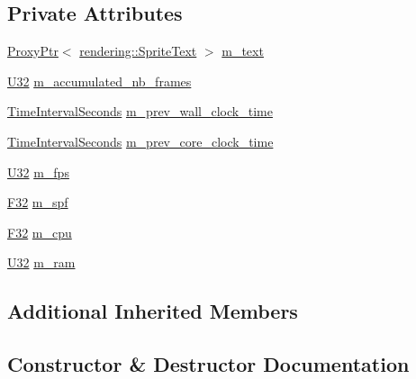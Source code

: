 \subsection*{Private Attributes}
\begin{DoxyCompactItemize}
\item 
\mbox{\hyperlink{classmage_1_1_proxy_ptr}{Proxy\+Ptr}}$<$ \mbox{\hyperlink{classmage_1_1rendering_1_1_sprite_text}{rendering\+::\+Sprite\+Text}} $>$ \mbox{\hyperlink{classmage_1_1script_1_1_stats_script_a1fe11e7a3622fa5e3585fb6786e2d2e7}{m\+\_\+text}}
\item 
\mbox{\hyperlink{namespacemage_aa5d6eaabaac3cdd01873d6a3d27e90f3}{U32}} \mbox{\hyperlink{classmage_1_1script_1_1_stats_script_a7ef910aceb585af53110697ea5b3f810}{m\+\_\+accumulated\+\_\+nb\+\_\+frames}}
\item 
\mbox{\hyperlink{namespacemage_a21c3d1575018d1e0720948713c76be1f}{Time\+Interval\+Seconds}} \mbox{\hyperlink{classmage_1_1script_1_1_stats_script_acb97500f32da69e9069482df1ebdb7b8}{m\+\_\+prev\+\_\+wall\+\_\+clock\+\_\+time}}
\item 
\mbox{\hyperlink{namespacemage_a21c3d1575018d1e0720948713c76be1f}{Time\+Interval\+Seconds}} \mbox{\hyperlink{classmage_1_1script_1_1_stats_script_a8bf822cd1950abc621f8bd751c00ef78}{m\+\_\+prev\+\_\+core\+\_\+clock\+\_\+time}}
\item 
\mbox{\hyperlink{namespacemage_aa5d6eaabaac3cdd01873d6a3d27e90f3}{U32}} \mbox{\hyperlink{classmage_1_1script_1_1_stats_script_adc14b9c342874824422d229c1f8573cc}{m\+\_\+fps}}
\item 
\mbox{\hyperlink{namespacemage_aa97e833b45f06d60a0a9c4fc22ae02c0}{F32}} \mbox{\hyperlink{classmage_1_1script_1_1_stats_script_a999da0fb2033212522a1c45a992dcd37}{m\+\_\+spf}}
\item 
\mbox{\hyperlink{namespacemage_aa97e833b45f06d60a0a9c4fc22ae02c0}{F32}} \mbox{\hyperlink{classmage_1_1script_1_1_stats_script_ad7af4d0fec97fd30637d6c1d393c8623}{m\+\_\+cpu}}
\item 
\mbox{\hyperlink{namespacemage_aa5d6eaabaac3cdd01873d6a3d27e90f3}{U32}} \mbox{\hyperlink{classmage_1_1script_1_1_stats_script_a2a064095ffab6d72370808f383a16580}{m\+\_\+ram}}
\end{DoxyCompactItemize}
\subsection*{Additional Inherited Members}


\subsection{Constructor \& Destructor Documentation}
\mbox{\label{classmage_1_1script_1_1_stats_script_a6863940cb48633fbd5fc56547dc72a76}} 
